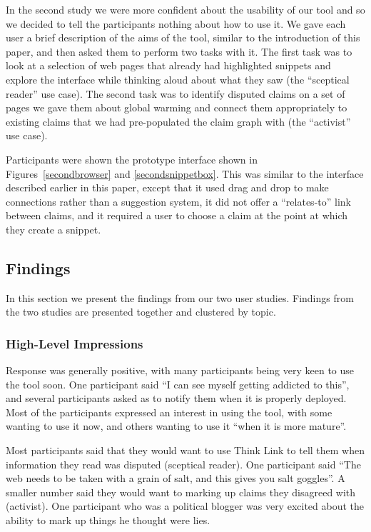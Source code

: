 \documentclass{chi2009}
\begin{document}
In the second study we were more confident about the usability of our tool and so we decided to tell the participants nothing about how to use it. We gave each user a brief description of the aims of the tool, similar to the introduction of this paper, and then asked them to perform two tasks with it. The first task was to look at a selection of web pages that already had highlighted snippets and explore the interface while thinking aloud about what they saw (the ``sceptical reader'' use case). The second task was to identify disputed claims on a set of pages we gave them about global warming and connect them appropriately to existing claims that we had pre-populated the claim graph with (the ``activist'' use case). 

Participants were shown the prototype interface shown in Figures~\ref{secondbrowser} and \ref{secondsnippetbox}. This was similar to the interface described earlier in this paper, except that it used drag and drop to make connections rather than a suggestion system, it did not offer a ``relates-to'' link between claims, and it required a user to choose a claim at the point at which they create a snippet. 

\subsection{Findings}

In this section we present the findings from our two user studies. Findings from the two studies are presented together and clustered by topic.

\subsubsection{High-Level Impressions}

Response was generally positive, with many participants being very keen to use the tool soon. One participant said ``I can see myself getting addicted to this'', and several participants asked as to notify them when it is properly deployed. Most of the participants expressed an interest in using the tool, with some wanting to use it now, and others wanting to use it ``when it is more mature''.

Most participants said that they would want to use Think Link to tell them when information they read was disputed (sceptical reader). One participant said ``The web needs to be taken with a grain of salt, and this gives you salt goggles''. A smaller number said they would want to marking up claims they disagreed with (activist). One participant who was a political blogger was very excited about the ability to mark up things he thought were lies.
\end{document}
